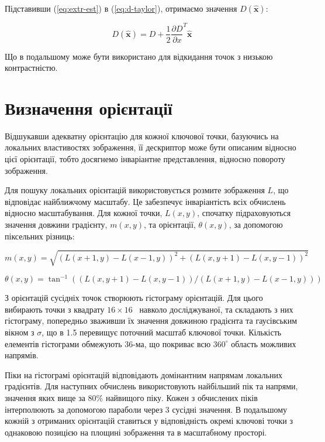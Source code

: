 Підставивши (\ref{eq:extr-est}) в (\ref{eq:d-taylor}), отримаємо значення $D(\hat{\mathbf{x}})$:

\begin{equation*}
  D(\hat{\mathbf{x}}) = D + \frac12 {\frac{\partial D}{\partial x}}^T \hat{\mathbf{x}}
\end{equation*}

Що в подальшому може бути використано для відкидання точок з низькою контрастністю.

\section{Визначення орієнтації}

Відшукавши адекватну орієнтацію для кожної ключової точки, базуючись на локальних властивостях зображення, її дескриптор може бути описаним відносно цієї орієнтації, тобто досягнемо інваріантне представлення, відносно повороту зображення.

Для пошуку локальних орієнтацій використовується розмите зображення $L$, що відповідає найближчому масштабу. Це забезпечує інваріантість всіх обчислень відносно масштабування. Для кожної точки, $L(x,y)$, спочатку підраховуються значення довжини градієнту, $m(x,y)$, та орієнтації, $\theta(x,y)$, за допомогою піксельних різниць:

\[
  m(x,y) = \sqrt{(L(x+1, y) - L(x-1, y))^2 + (L(x,y+1) - L(x,y-1))^2} 
\]

\[
  \theta(x,y) = \tan^{-1}((L(x,y+1) - L(x,y-1)) / (L(x+1,y) - L(x-1,y)))
\]

З орієнтацій сусідніх точок створюють гістограму орієнтацій. Для цього вибирають точки з квадрату $16\times16$~\cite{Meng_implementingthe} навколо досліджуваної, та складають з них гістограму, попередньо зваживши їх значення довжиною градієнта та гаусівським вікном з $\sigma$, що в 1.5 перевищує поточний масштаб ключової точки. Кількість елементів гістограми обмежують 36-ма, що покриває всю $360^\circ$ область можливих напрямів.

Піки на гістограмі орієнтацій відповідають домінантним напрямам локальних градієнтів. Для наступних обчислень використовують найбільший пік та напрями, значення яких вище за 80\% найвищого піку. Кожен з обчислених піків інтерполюють за допомогою параболи через 3 сусідні значення. В подальшому кожній з отриманих орієнтацій ставиться у відповідність окремі ключові точки з однаковою позицією на площині зображення та в масштабному просторі. 

